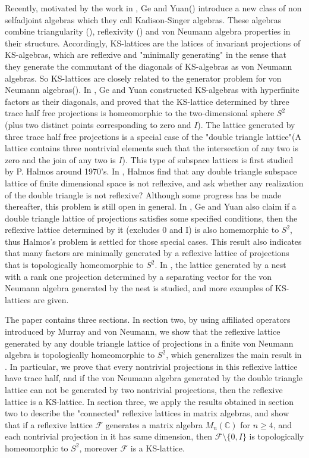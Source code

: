 \documentclass[12pt]{article}
\newcommand{\FFF}{\mathcal F}
\newcommand{\C}{\mathbb C} %
\begin{document}
{Recently, motivated by the work in \cite{KS}, Ge and Yuan(\cite{GY1}) introduce a new
class of non selfadjoint algebras which they call Kadison-Singer algebras. 
These algebras combine triangularity
(\cite{KS}), reflexivity (\cite{Ha,Da}) and von Neumann algebra
properties in their structure. Accordingly, KS-lattices are the
latices of invariant projections of KS-algebras, which are reflexive and 
"minimally generating" in the sense that they generate the
commutant of the diagonals of KS-algebras as von Neumann algebras.
So KS-lattices are closely related to the generator problem for von Neumann
algebras(\cite{GS}). In \cite{GY1, GY2}, Ge and Yuan
constructed KS-algebras with hyperfinite factors as their diagonals, and proved that the KS-lattice
determined by three trace half free projections is homeomorphic
to the two-dimensional sphere $S^2$ (plus two distinct
points corresponding to zero and $I$). The lattice generated by three trace half free projections is 
a special case of the "double triangle lattice"(A lattice contains three nontrivial elements such that the intersection of any
two is zero and the join of any two is $I$). This type of subspace lattices is first studied by P. Halmos 
around 1970's. In \cite{Ha}, Halmos find that any double triangle subspace lattice of  finite dimensional space
is not reflexive, and ask whether any realization of the double triangle is not reflexive? Although some progress
has be made thereafter, this problem is still open in general. In \cite{GY2}, Ge and Yuan also claim if
a double triangle lattice of projections satisfies some specified conditions, then the reflexive lattice determined by it
(excludes 0 and I) is also homemorphic to $S^2$, thus Halmos's problem is settled for those special cases.
This result also indicates that many factors are minimally generated by a reflexive
lattice of projections that is topologically homeomorphic to
$S^2$. In \cite{Hou, WY}, the lattice
generated by a nest with a rank one projection determined by a
separating vector for the von Neumann algebra generated by the nest is studied, and more examples
of KS-lattices are given. 

The paper contains three sections. In section two, by using affiliated 
operators introduced by Murray and von Neumann,
we show that the reflexive lattice generated by any
double triangle lattice of projections in a finite von Neumann
algebra is topologically homeomorphic to $S^2$,
which generalizes the main result in \cite{GY2}. In particular, we
prove that every nontrivial projections in this reflexive lattice have
trace half, and if the von Neumann algebra generated by the double
triangle lattice can not be generated by two nontrivial projections,
then the reflexive lattice is a KS-lattice. In section three, we apply the results 
obtained in section two to describe the "connected" reflexive lattices
in matrix algebras, and show that
if a reflexive lattice $\FFF$ generates a matrix algebra
$M_n(\C)$ for $n\geq 4$, and each
nontrivial projection in it has same dimension, then $\FFF\setminus\{0,I\}$ is
topologically homeomorphic to $S^2$, moreover $\FFF$ is a KS-lattice.



}
\end{document}
